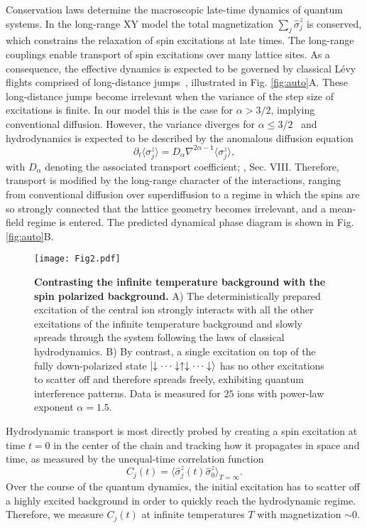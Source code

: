 \documentclass[aps,10pt,reprint,groupedaddress,superscriptaddress]{revtex4-2}
\begin{document}
Conservation laws determine the  macroscopic late-time dynamics of quantum systems. In the long-range XY model the total magnetization $\sum_j \hat \sigma_j^z$ is conserved, which constrains the relaxation of spin excitations at late times. The long-range couplings enable transport of spin excitations over many lattice sites. As a consequence, the effective dynamics is expected to be governed by classical L\'evy flights comprised of long-distance jumps~\cite{PhysRevB.101.020416}, illustrated in Fig. \ref{fig:auto}A. These long-distance jumps become irrelevant when the variance of the step size of excitations is finite. In our model this is the case for $\alpha>3/2$, implying conventional diffusion. However, the variance diverges for $\alpha \leq 3/2$~\cite{RevModPhys.87.483} and hydrodynamics is expected to be described by the anomalous diffusion equation
\begin{equation}
    \partial_t \langle\sigma^z_j\rangle = D_\alpha \nabla^{2\alpha - 1} \langle{\sigma^z_j}\rangle,
    \label{eq:gendiff}
\end{equation}
with $D_\alpha$ denoting the associated transport coefficient; \cite{SI}, Sec. VIII.
 Therefore, transport is modified by the long-range character of the interactions, ranging from conventional diffusion over superdiffusion to a regime in which the spins are so strongly connected that the lattice geometry becomes irrelevant, and a mean-field regime is entered. The predicted dynamical phase diagram is shown in Fig. \ref{fig:auto}B. 

\begin{figure*}
\centering
\texttt{[image: Fig2.pdf]}
\caption{\textbf{Contrasting the infinite temperature background with the spin polarized background.} A) The deterministically prepared excitation of the central ion strongly interacts with all the other excitations of the infinite temperature background and slowly spreads through the system following the laws of classical hydrodynamics. B) By contrast, a single excitation on top of the fully down-polarized state $\ket{\downarrow\cdots\downarrow\uparrow\downarrow \cdots\downarrow}$ has no other excitations to scatter off and therefore spreads freely, exhibiting quantum interference patterns. Data is measured for $25$ ions with power-law exponent $\alpha=1.5$. 
 }\label{fig:singlevsmultiple}
\end{figure*}


Hydrodynamic transport is most directly probed by creating a spin excitation at time $t=0$ in the center of the chain and tracking how it propagates in space and time, as measured by the unequal-time correlation function  
\begin{equation}
    C_j(t)=\langle{\hat\sigma^z_j(t)\hat\sigma^z_0}\rangle_{T=\infty}.
    \label{eq:def_Cj}
\end{equation}
Over the course of the quantum dynamics, the initial excitation has to scatter off a highly excited background in order to quickly reach the hydrodynamic regime. Therefore, we measure 
$ C_j(t)$ at infinite temperatures $T$ with magnetization $\sim0$. 
\end{document}
